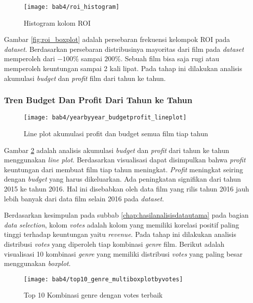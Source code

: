 \begin{figure}[H]
	\centering  
	\texttt{[image: bab4/roi\_histogram]}   
	\caption{Histogram kolom ROI}
	\label{fig:roi_histogram} 
\end{figure} 

Gambar \ref{fig:roi_boxplot} adalah persebaran frekuensi kelompok ROI pada \textit{dataset}. Berdasarkan persebaran distribusinya mayoritas dari film pada \textit{dataset} memperoleh dari $-100\%$ sampai $200\%$. Sebuah film bisa saja rugi atau memperoleh keuntungan sampai 2 kali lipat. Pada tahap ini dilakukan analisis akumulasi \textit{budget} dan \textit{profit} film dari tahun ke tahun.

\subsubsection{Tren Budget Dan Profit Dari Tahun ke Tahun}
\begin{figure}[H]
	\centering  
	\texttt{[image: bab4/yearbyyear\_budgetprofit\_lineplot]}   
	\caption{Line plot akumulasi profit dan budget semua film tiap tahun}
	\label{fig:yearbyyear_budgetprofit_lineplot} 
\end{figure} 

Gambar \ref{fig:yearbyyear_budgetprofit_lineplot} adalah analisis akumulasi \textit{budget} dan \textit{profit} dari tahun ke tahun menggunakan \textit{line plot}. Berdasarkan visualisasi dapat disimpulkan bahwa \textit{profit} keuntungan dari membuat film tiap tahun meningkat. \textit{Profit} meningkat seiring dengan \textit{budget} yang harus dikeluarkan. Ada peningkatan signifikan dari tahun 2015 ke tahun 2016. Hal ini disebabkan oleh data film yang rilis tahun 2016 jauh lebih banyak dari data film selain 2016 pada \textit{dataset}.    

Berdasarkan kesimpulan pada subbab \ref{chap:hasilanalisisdatautama} pada bagian \textit{data selection}, kolom \textit{votes} adalah kolom yang memiliki korelasi positif paling tinggi terhadap keuntungan yaitu \textit{revenue}. Pada tahap ini dilakukan analisis distribusi \textit{votes} yang diperoleh tiap kombinasi \textit{genre} film. Berikut adalah visualisasi 10 kombinasi \textit{genre} yang memiliki distribusi \textit{votes} yang paling besar menggunakan \textit{boxplot}. 


\begin{figure}[H]
	\centering  
	\texttt{[image: bab4/top10\_genre\_multiboxplotbyvotes]}   
	\caption{Top 10 Kombinasi genre dengan votes terbaik}
	\label{fig:top10_genre_multiboxplotbyvotes} 
\end{figure} 

